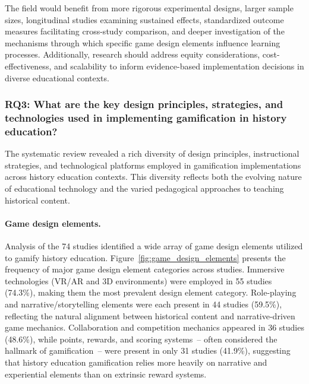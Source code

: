 \documentclass[a4paper,fleqn]{cas-sc}
\begin{document}
The field would benefit from more rigorous experimental designs, larger sample sizes, longitudinal studies examining sustained effects, standardized outcome measures facilitating cross-study comparison, and deeper investigation of the mechanisms through which specific game design elements influence learning processes. Additionally, research should address equity considerations, cost-effectiveness, and scalability to inform evidence-based implementation decisions in diverse educational contexts.

\subsubsection{RQ3: What are the key design principles, strategies, and technologies used in implementing gamification in history education?}

The systematic review revealed a rich diversity of design principles, instructional strategies, and technological platforms employed in gamification implementations across history education contexts. This diversity reflects both the evolving nature of educational technology and the varied pedagogical approaches to teaching historical content.

\paragraph{Game design elements.}

Analysis of the 74 studies identified a wide array of game design elements utilized to gamify history education. Figure~\ref{fig:game_design_elements} presents the frequency of major game design element categories across studies. Immersive technologies (VR/AR and 3D environments) were employed in 55 studies (74.3\%), making them the most prevalent design element category. Role-playing and narrative/storytelling elements were each present in 44 studies (59.5\%), reflecting the natural alignment between historical content and narrative-driven game mechanics. Collaboration and competition mechanics appeared in 36 studies (48.6\%), while points, rewards, and scoring systems~-- often considered the hallmark of gamification~-- were present in only 31 studies (41.9\%), suggesting that history education gamification relies more heavily on narrative and experiential elements than on extrinsic reward systems.
\end{document}
